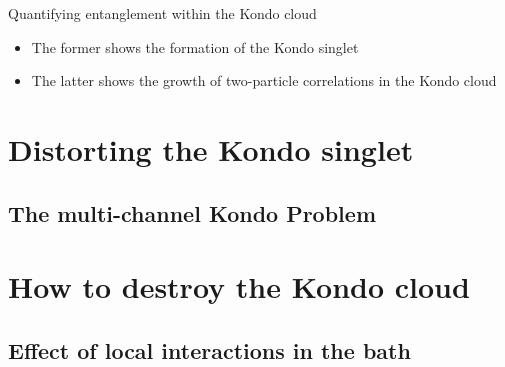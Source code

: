 \documentclass[10pt,aspectratio=169]{beamer}
\begin{document}
\begin{frame}{Quantifying entanglement within the Kondo cloud}
{\vspace*{\fill}
\begin{itemize}
	\item The former shows the formation of the \alert{Kondo singlet}\\[10pt]
	\item The latter shows the growth of two-particle correlations in the \alert{Kondo cloud}
\end{itemize}
}
\end{frame}

\section{Distorting the Kondo singlet}
\subsection{The multi-channel Kondo Problem}

\section{How to destroy the Kondo cloud}
\subsection{Effect of local interactions in the bath}
\end{document}
